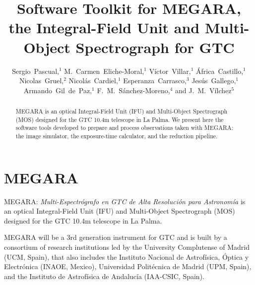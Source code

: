 
\resetcounters


\title{Software Toolkit for MEGARA, the Integral-Field Unit and Multi-Object Spectrograph
for GTC}
\author{Sergio~Pascual,$^1$ M.~Carmen~Eliche-Moral,$^1$ 
V\'ictor~Villar,$^1$ \'Africa~Castillo,$^1$ Nicolas~Gruel,$^2$ 
Nicol\'as~Cardiel,$^1$ Esperanza~Carrasco,$^3$ Jes\'us~Gallego,$^1$ 
Armando~Gil~de~Paz,$^1$ F.~M.~S\'anchez-Moreno,$^4$
and J.~M.~V\'ilchez$^5$
}


\begin{abstract}
MEGARA is an optical Integral-Field Unit (IFU) and Multi-Object Spectrograph (MOS) designed for the GTC 10.4m telescope in La Palma. We present here the software tools developed to prepare and process observations taken with MEGARA: the image simulator, the exposure-time calculator, and the reduction pipeline.
\end{abstract}

\section{MEGARA}
MEGARA: \emph{Multi-Espectr\'ografo en GTC de Alta Resoluci\'on para Astronom\'ia}  is an optical Integral-Field Unit (IFU) and Multi-Object Spectrograph (MOS) designed for the GTC 10.4m telescope in La Palma.

MEGARA will be a 3rd generation instrument for GTC and is built by a consortium of research institutions led by the University Complutense of Madrid (UCM, Spain), that also includes the Instituto Nacional de Astrof\'isica, \'Optica y Electr\'onica (INAOE, Mexico), Universidad Polit\'ecnica de Madrid (UPM, Spain), and the Instituto de Astrof\'isica de Andaluc\'ia  (IAA-CSIC, Spain).

